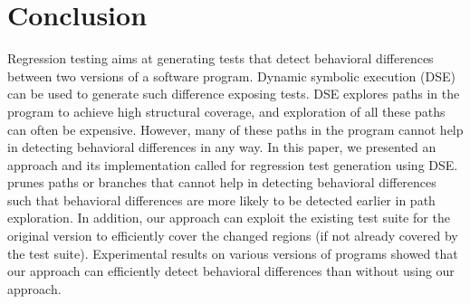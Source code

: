 \section{Conclusion}
\label{sec:conclusion}
Regression testing aims at generating tests that detect behavioral differences between two versions of a software program. Dynamic symbolic execution (DSE) can be used to generate such difference exposing tests. DSE explores paths in the program to achieve high structural coverage, and exploration of all these paths can often be expensive. However, many of these paths in the program cannot help in detecting behavioral differences in any way. In this paper, we presented an approach and its implementation called  for regression test generation using DSE.  prunes paths or branches that cannot help in detecting behavioral differences such that behavioral differences are more likely to be detected earlier in path exploration. In addition, our approach can exploit the existing test suite for the original version to efficiently cover the changed regions (if not already covered by the test suite). 
Experimental results on various versions of programs showed that our approach can efficiently detect behavioral differences than without using our approach. 

